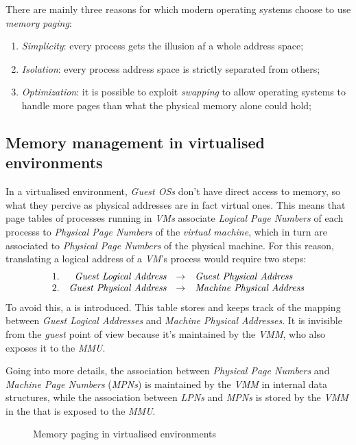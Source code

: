 \noindent
There are mainly three reasons for which modern operating systems choose to use
\emph{memory paging}:
\begin{enumerate}
    \item \emph{Simplicity}: every process gets the illusion af a whole address
    space;
    \item \emph{Isolation}: every process address space is strictly separated
    from others;
    \item \emph{Optimization}: it is possible to exploit \emph{swapping} to allow
    operating systems to handle more pages than what the physical memory alone
    could hold;
\end{enumerate}

\subsection{Memory management in virtualised environments}
In a virtualised environment, \emph{Guest OSs} don't have direct access to memory,
so what they percive as physical addresses are in fact virtual ones. This means
that page tables of processes running in \emph{VMs} associate \emph{Logical Page
Numbers} of each processs to \emph{Physical Page Numbers} of the \emph{virtual machine},
which in turn are associated to \emph{Physical Page Numbers} of the physical
machine. For this reason, translating a logical address of a \emph{VM}'s process
would require two steps:
\[\begin{array}{lrcl}
    1. & \emph{Guest Logical Address} & \to & \emph{Guest Physical Address}\\
    2. & \emph{Guest Physical Address} & \to & \emph{Machine Physical Address}
\end{array}\]
To avoid this, a  is introduced. This table stores and keeps
track of the mapping between \emph{Guest Logical Addresses} and \emph{Machine
Physical Addresses}. It is invisible from the \emph{guest} point of view
because it's maintained by the \emph{VMM}, who also exposes it to the \emph{MMU}.

Going into more details, the association between \emph{Physical Page Numbers}
and \emph{Machine Page Numbers} (\emph{MPNs}) is maintained by the \emph{VMM}
in internal data structures, while the association between \emph{LPNs} and
\emph{MPNs} is stored by the \emph{VMM} in the  that is
exposed to the \emph{MMU}.

\begin{figure}[h!]
    \centering
    \caption{Memory paging in virtualised environments}
\end{figure}

